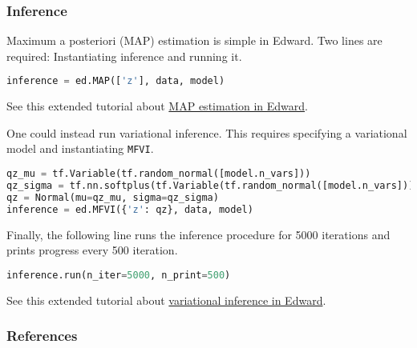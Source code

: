 \subsubsection{Inference}

Maximum a posteriori (MAP) estimation is simple in Edward. Two lines are
required: Instantiating inference and running it.
\begin{lstlisting}[language=Python]
inference = ed.MAP(['z'], data, model)
\end{lstlisting}

See this extended tutorial about
\href{tut_MAP}{MAP estimation in Edward}.

One could instead run variational inference. This requires specifying
a variational model and instantiating \texttt{MFVI}.
\begin{lstlisting}[language=Python]
qz_mu = tf.Variable(tf.random_normal([model.n_vars]))
qz_sigma = tf.nn.softplus(tf.Variable(tf.random_normal([model.n_vars])))
qz = Normal(mu=qz_mu, sigma=qz_sigma)
inference = ed.MFVI({'z': qz}, data, model)
\end{lstlisting}
Finally, the following line runs the inference procedure for 5000
iterations and prints progress every 500 iteration.
\begin{lstlisting}[language=Python]
inference.run(n_iter=5000, n_print=500)
\end{lstlisting}
See this extended tutorial about
\href{tut_variational_inference}{variational inference in Edward}.

\subsubsection{References}

